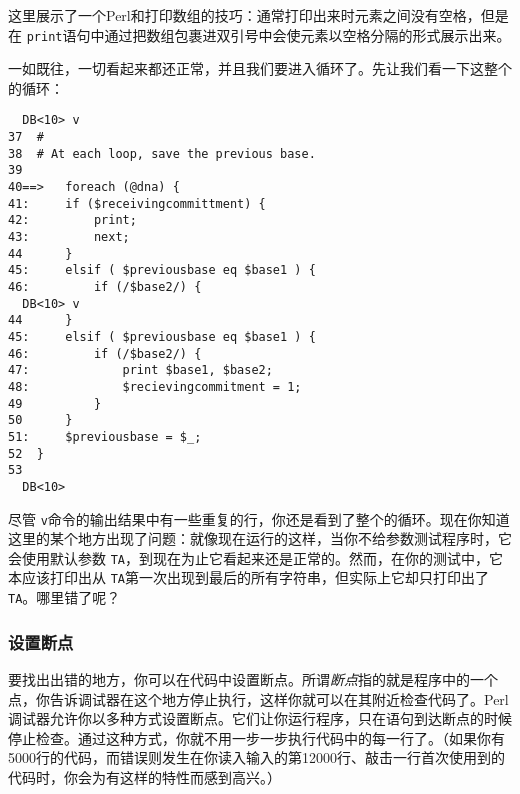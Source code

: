 这里展示了一个Perl和打印数组的技巧：通常打印出来时元素之间没有空格，但是在 \verb|print|语句中通过把数组包裹进双引号中会使元素以空格分隔的形式展示出来。

一如既往，一切看起来都还正常，并且我们要进入循环了。先让我们看一下这整个的循环：

\begin{lstlisting}
  DB<10> v
37 	#
38 	# At each loop, save the previous base.
39 	
40==>	foreach (@dna) {
41:	    if ($receivingcommittment) {
42:	        print;
43:	        next;
44 	    }
45:	    elsif ( $previousbase eq $base1 ) {
46:	        if (/$base2/) {
  DB<10> v
44 	    }
45:	    elsif ( $previousbase eq $base1 ) {
46:	        if (/$base2/) {
47:	            print $base1, $base2;
48:	            $recievingcommitment = 1;
49 	        }
50 	    }
51:	    $previousbase = $_;
52 	}
53 	
  DB<10> 
\end{lstlisting}

尽管 \verb|v|命令的输出结果中有一些重复的行，你还是看到了整个的循环。现在你知道这里的某个地方出现了问题：就像现在运行的这样，当你不给参数测试程序时，它会使用默认参数 \verb|TA|，到现在为止它看起来还是正常的。然而，在你的测试中，它本应该打印出从 \verb|TA|第一次出现到最后的所有字符串，但实际上它却只打印出了 \verb|TA|。哪里错了呢？

\subsubsection{设置断点}
要找出出错的地方，你可以在代码中设置断点。所谓\textit{断点}指的就是程序中的一个点，你告诉调试器在这个地方停止执行，这样你就可以在其附近检查代码了。Perl调试器允许你以多种方式设置断点。它们让你运行程序，只在语句到达断点的时候停止检查。通过这种方式，你就不用一步一步执行代码中的每一行了。（如果你有5000行的代码，而错误则发生在你读入输入的第12000行、敲击一行首次使用到的代码时，你会为有这样的特性而感到高兴。）

